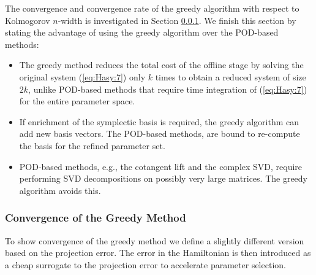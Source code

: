 The convergence and convergence rate of the greedy algorithm with respect to Kolmogorov $n$-width is investigated in Section \ref{chap:SyMo.PrSy:3}. We finish this section by stating the advantage of using the greedy algorithm over the POD-based methods:
\begin{itemize}
\item The greedy method reduces the total cost of the offline stage by solving the original system (\ref{eq:Hasy:7}) only $k$ times to obtain a reduced system of size $2k$, unlike POD-based methods that require time integration of (\ref{eq:Hasy:7}) for the entire parameter space.
\item If enrichment of the symplectic basis is required, the greedy algorithm can add new basis vectors. The POD-based methods, are bound to re-compute the basis for the refined parameter set.
\item POD-based methods, e.g., the cotangent lift and the complex SVD, require performing SVD decompositions on possibly very large matrices. The greedy algorithm avoids this.
\end{itemize}






\subsubsection{Convergence of the Greedy Method} \label{chap:SyMo.PrSy:3}

To show convergence of the greedy method we define a slightly different version based on the projection error. The error in the Hamiltonian is then introduced as a cheap surrogate to the projection error to accelerate parameter selection.

